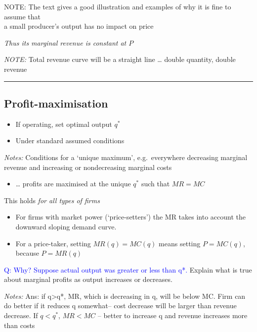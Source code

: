 \documentclass[]{article}
\providecommand{\tightlist}{%
  \setlength{\itemsep}{0pt}\setlength{\parskip}{0pt}}
\begin{document}
NOTE: The text gives a good illustration and examples of why it is fine
to assume that\\
a small producer's output has no impact on price

\bigskip

\emph{Thus its marginal revenue is constant at \(P\)}

\emph{NOTE:} Total revenue curve will be a straight line \ldots{} double
quantity, double revenue

\begin{center}\rule{0.5\linewidth}{\linethickness}\end{center}

\hypertarget{profit-maximisation}{%
\subsection{Profit-maximisation}\label{profit-maximisation}}

\begin{itemize}
\tightlist
\item
  If operating, set optimal output \(q^*\)
\item
  Under standard assumed conditions
\end{itemize}

\emph{Notes:} Conditions for a `unique maximum', e.g.~everywhere
decreasing marginal revenue and increasing or nondecreasing marginal
costs

\begin{itemize}
\tightlist
\item
  \ldots{} profits are maximised at the unique \(q^*\) such that
  \(MR=MC\)
\end{itemize}

\bigskip

This holds \emph{for all types of firms}

\begin{itemize}
\item
  For firms with market power (`price-setters') the MR takes into
  account the downward sloping demand curve.
\item
  For a price-taker, setting \(MR(q)=MC(q)\) means setting \(P=MC(q)\),
  because \(P=MR(q)\)
\end{itemize}

\textcolor{blue}{Q:  Why? Suppose actual output was greater or less than q*.}
Explain what is true about marginal profits as output increases or
decreases.

\emph{Notes:} Ans: if q\textgreater q*, MR, which is decreasing in q,
will be below MC. Firm can do better if it reduces q somewhat-- cost
decrease will be larger than revenue decrease. If \(q<q^{\ast}\),
\(MR<MC\) -- better to increase q and revenue increases more than costs
\end{document}
